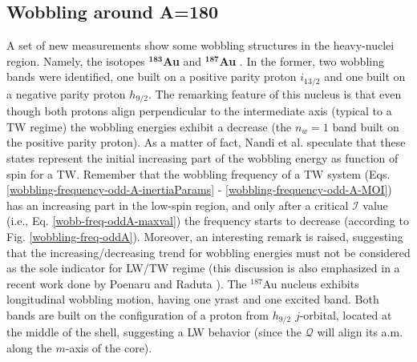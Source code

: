 \subsection{Wobbling around A=180}

A set of new measurements show some wobbling structures in the heavy-nuclei region. Namely, the isotopes $^\mathbf{183}$\textbf{Au} \cite{nandi2020first} and $^\mathbf{187}$\textbf{Au} \cite{sensharma2020longitudinal,sensharma2021wobbling}. In the former, two wobbling bands were identified, one built on a positive parity proton $i_{13/2}$ and one built on a negative parity proton $h_{9/2}$. The remarking feature of this nucleus is that even though both protons align perpendicular to the intermediate axis (typical to a TW regime) the wobbling energies exhibit a decrease (the $n_w=1$ band built on the positive parity proton). As a matter of fact, Nandi et al. speculate that these states represent the initial increasing part of the wobbling energy as function of spin for a TW. Remember that the wobbling frequency of a TW system (Eqs. \ref{wobbling-frequency-odd-A-inertiaParams} - \ref{wobbling-frequency-odd-A-MOI}) has an increasing part in the low-spin region, and only after a critical $\mathscr{I}$ value (i.e., Eq. \ref{wobb-freq-oddA-maxval}) the frequency starts to decrease (according to Fig. \ref{wobbling-freq-oddA}). Moreover, an interesting remark is raised, suggesting that the increasing/decreasing trend for wobbling energies must not be considered as the sole indicator for LW/TW regime (this discussion is also emphasized in a recent work done by Poenaru and Raduta \cite{poenaru2021extensive1,poenaru2021extensive2}). The $^{187}$Au nucleus exhibits longitudinal wobbling motion, having one yrast and one excited band. Both bands are built on the configuration of a proton from $h_{9/2}$ $j$-orbital, located at the middle of the shell, suggesting a LW behavior (since the $\mathcal{Q}$ will align its a.m. along the $m$-axis of the core). 

